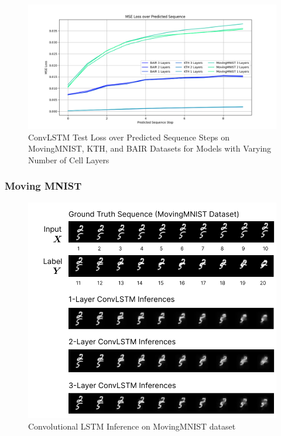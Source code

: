 \documentclass{scrartcl}
\begin{document}
\begin{figure}[H]
	\centering
	\includegraphics[width=1\textwidth]{plots/convlstm_seq_loss.png}
	\caption{ConvLSTM Test Loss over Predicted Sequence Steps on MovingMNIST, KTH, and BAIR Datasets for Models with Varying Number of Cell Layers}
	\label{plt:convlstm_seq_loss}
\end{figure}

\subsubsection{Moving MNIST}
\label{subsubsec:mmnist}

\begin{figure}[H]
	\begin{center}
		\includegraphics[width=1\textwidth]{images/mmnist/mmnist_inferences_1.png}
	\end{center}
	\caption{Convolutional LSTM Inference on MovingMNIST dataset}
	\label{img:lstm_mmnist_inference_1}
\end{figure}
\end{document}

